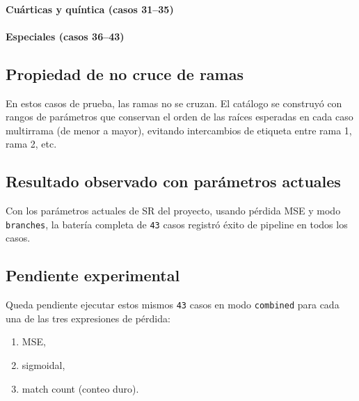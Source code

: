 \documentclass[12pt]{article}
\begin{document}
\paragraph{Cuárticas y quíntica (casos 31--35)}
\begin{itemize}[leftmargin=1.5em]
\end{itemize}

\paragraph{Especiales (casos 36--43)}
\begin{itemize}[leftmargin=1.5em]
\end{itemize}

\subsection{Propiedad de no cruce de ramas}
En estos casos de prueba, las ramas no se cruzan. El catálogo se construyó con rangos de parámetros que conservan el orden de las raíces esperadas en cada caso multirrama (de menor a mayor), evitando intercambios de etiqueta entre rama 1, rama 2, etc.

\subsection{Resultado observado con parámetros actuales}
Con los parámetros actuales de SR del proyecto, usando pérdida MSE y modo \texttt{branches}, la batería completa de \texttt{43} casos registró éxito de pipeline en todos los casos.

\subsection{Pendiente experimental}
Queda pendiente ejecutar estos mismos \texttt{43} casos en modo \texttt{combined} para cada una de las tres expresiones de pérdida:
\begin{enumerate}[leftmargin=1.5em]
    \item MSE,
    \item sigmoidal,
    \item match count (conteo duro).
\end{enumerate}
\end{document}
